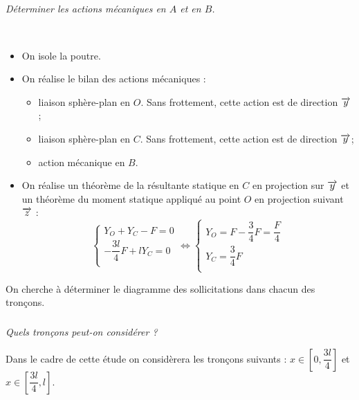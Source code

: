 \documentclass[10pt,fleqn]{article} %
\begin{document}
\begin{multicols}{2}
\subparagraph{}
\textit{Déterminer les actions mécaniques en $A$ et en $B$.}
\ifprof
\begin{corrige}~\\

\begin{itemize}[label=,font=\color{ocre}] 
\item On isole la poutre.
\item On réalise le bilan des actions mécaniques :
\begin{itemize}[label=,font=\color{ocre} \footnotesize] 
\item liaison sphère-plan en $O$. Sans frottement, cette action est de direction $\overrightarrow{y}$;
\item liaison sphère-plan en $C$. Sans frottement, cette action est de direction $\overrightarrow{y}$;
\item action mécanique en $B$.
\end{itemize}
\item On réalise un théorème de la résultante statique en $C$ en projection sur $\overrightarrow{y}$ et un théorème du moment statique appliqué au point $O$ en projection suivant $\overrightarrow{z}$ :
$$
\left\{
\begin{array}{l}
Y_O + Y_C -F = 0 \\
-\dfrac{3l}{4}F + l Y_C = 0 \\
\end{array}
\right.
\Leftrightarrow
\left\{
\begin{array}{l}
Y_O = F -  \dfrac{3}{4}F  = \dfrac{F}{4} \\
Y_C = \dfrac{3}{4}F \\
\end{array}
\right.
$$
\end{itemize}

\end{corrige}
\else 
\fi
On cherche à déterminer le diagramme des sollicitations dans chacun des tronçons.

\subparagraph{}
\textit{Quels tronçons peut-on considérer ?}
\ifprof
\begin{corrige}
Dans le cadre de cette étude on considèrera les tronçons suivants : $x\in\left[0,\dfrac{3l}{4}\right]$ et $x\in\left[\dfrac{3l}{4},l\right]$.

\end{corrige}
\else 
\fi


\end{multicols}
\end{document}
